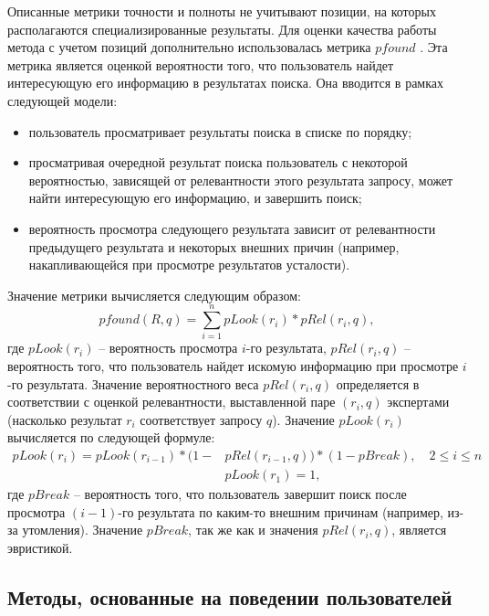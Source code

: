 \documentclass[12pt,a4paper]{report}
\begin{document}
Описанные метрики точности и полноты не учитывают позиции, на которых располагаются специализированные результаты. Для оценки качества работы метода с учетом позиций дополнительно использовалась метрика $pfound$ \cite{PFound}. Эта метрика является оценкой вероятности того, что пользователь найдет интересующую его информацию в результатах поиска. 
Она вводится в рамках следующей модели:
\begin{itemize}
\item пользователь просматривает результаты поиска в списке по порядку;
\item просматривая очередной результат поиска пользователь с некоторой вероятностью, зависящей от релевантности этого результата запросу, может найти интересующую его информацию, и завершить поиск;
\item вероятность просмотра следующего результата зависит от релевантности предыдущего результата и некоторых внешних причин (например, накапливающейся при просмотре результатов усталости). 
\end{itemize}
Значение метрики вычисляется следующим образом:
\begin{equation}
pfound(R, q) = \sum \limits_{i=1}^{n} pLook(r_i) * pRel(r_i, q),
\end{equation}
где $pLook(r_i)$ -- вероятность просмотра $i$-го результата, $pRel(r_i, q)$ -- вероятность того, что пользователь найдет искомую информацию при просмотре $i$-го результата. Значение вероятностного веса $pRel(r_i, q)$ определяется в соответствии с оценкой релевантности, выставленной паре $(r_i, q)$ экспертами (насколько результат $r_i$ соответствует запросу $q$). Значение $pLook(r_i)$ вычисляется по следующей формуле:
\begin{align}
pLook(r_i) = pLook(r_{i-1}) * (1 - &pRel(r_{i-1}, q)) * (1 - pBreak), \quad 2 \leq i \leq n \\
&pLook(r_1) = 1,
\end{align}
где $pBreak$ -- вероятность того, что пользователь завершит поиск после просмотра $(i-1)$-го результата по каким-то внешним причинам (например, из-за утомления). Значение $pBreak$, так же как и значения $pRel(r_i, q)$, является эвристикой.

\subsection{Методы, основанные на поведении пользователей}
\end{document}
